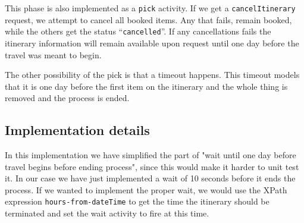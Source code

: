 This phase is also implemented as a \texttt{pick} activity. If we get a \texttt{cancelItinerary} request, we attempt to cancel all booked items. Any that fails, remain booked, while the others get the status ``\texttt{cancelled}''. If any cancellations fails the itinerary information will remain available upon request until one day before the travel was meant to begin. 

The other possibility of the pick is that a timeout happens. This timeout models that it is one day before the first item on the itinerary and the whole thing is removed and the process is ended.


\subsection{Implementation details}

In this implementation we have simplified the part of "wait until one day before travel begins before ending process", since this would make it harder to unit test it. In our case we have just implemented a wait of 10 seconds before it ends the process. If we wanted to implement the proper wait, we would use the XPath expression \texttt{hours-from-dateTime} to get the time the itinerary should be terminated and set the wait activity to fire at this time.
